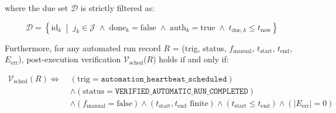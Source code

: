 \documentclass[11pt,a4paper]{article}
\theoremstyle{definition}
\begin{document}
where the due set $\mathcal{D}$ is strictly filtered as:

\begin{equation}
\mathcal{D} = \left\{ \text{id}_k \;\middle|\; j_k \in \mathcal{J} \;\land\; \text{done}_k = \text{false} \;\land\; \text{auth}_k = \text{true} \;\land\; t_{\text{due},k} \le t_{\text{now}} \right\}
\label{eq:dueset}
\end{equation}

Furthermore, for any automated run record $R$ = (trig, status, $f_{\text{manual}}$, $t_{\text{start}}$, $t_{\text{end}}$, $E_{\text{err}}$), post-execution verification $\mathcal{V}_{\text{sched}}$($R$) holds if and only if:

\begin{equation}
\begin{aligned}
\mathcal{V}_{\text{sched}}(R) \iff\;& (\text{trig} = \texttt{automation\_heartbeat\_scheduled}) \\
&\land (\text{status} = \texttt{VERIFIED\_AUTOMATIC\_RUN\_COMPLETED}) \\
&\land (f_{\text{manual}} = \text{false}) \land (t_{\text{start}}, t_{\text{end}} \text{ finite}) \land (t_{\text{start}} \le t_{\text{end}}) \land (|E_{\text{err}}| = 0)
\end{aligned}
\label{eq:verify_sched}
\end{equation}
\end{document}
